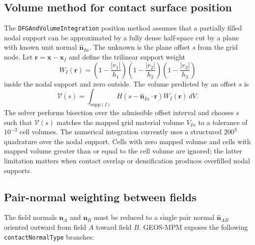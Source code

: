 \subsection{Volume method for contact surface position}
\label{subsec:volume-method-contact-position}

The \texttt{DFGAndVolumeIntegration} position method assumes that a partially filled nodal support can be approximated by a fully dense half-space cut by a plane with known unit normal $\hat{\mathbf{n}}_{I\alpha}$.  The unknown is the plane offset $s$ from the grid node.  Let $\mathbf{r}=\mathbf{x}-\mathbf{x}_I$ and define the trilinear support weight
\begin{equation}
  W_I(\mathbf{r})=
  \left(1-\frac{|r_1|}{h_1}\right)
  \left(1-\frac{|r_2|}{h_2}\right)
  \left(1-\frac{|r_3|}{h_3}\right)
\end{equation}
inside the nodal support and zero outside.  The volume predicted by an offset $s$ is
\begin{equation}
  \mathcal{V}(s)=
  \int_{\mathrm{supp}(I)}
  H\!\left(s-\hat{\mathbf{n}}_{I\alpha}\cdot\mathbf{r}\right)
  W_I(\mathbf{r})\,dV.
  \label{eq:contact-volume-offset}
\end{equation}
The solver performs bisection over the admissible offset interval and chooses $s$ such that $\mathcal{V}(s)$ matches the mapped grid material volume $V_{I\alpha}$ to a tolerance of $10^{-3}$ cell volumes.  The numerical integration currently uses a structured $200^3$ quadrature over the nodal support.  Cells with zero mapped volume and cells with mapped volume greater than or equal to the cell volume are ignored; the latter limitation matters when contact overlap or densification produces overfilled nodal supports.

\subsection{Pair-normal weighting between fields}
\label{subsec:contact-normal-weighting}

The field normals $\mathbf{n}_A$ and $\mathbf{n}_B$ must be reduced to a single pair normal $\hat{\mathbf{n}}_{AB}$ oriented outward from field $A$ toward field $B$.  GEOS-MPM exposes the following \texttt{contactNormalType} branches:

